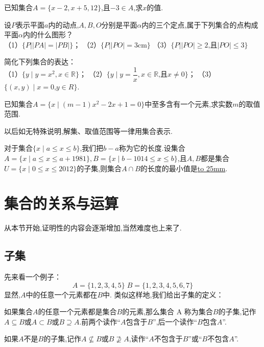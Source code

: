 \documentclass[lang=cn,math=cm,chinesefont=nofont,11pt,scheme=chinese,twocol]{elegantbook}
\begin{document}
\begin{exercise}\label{exer:6}
  已知集合$A=\{x-2,x+5,12\}$,且$-3\in A$,求$x$的值.
\end{exercise}

\begin{exercise}\label{exer:7}
  设$P$表示平面$a$内的动点,$A,B,O$分别是平面$\alpha$内的三个定点,属于下列集合的点构成平面$\alpha$内的什么图形？\\
  （1）$\{P||PA|=|PB|\}$；
  （2）$\{P||PO|=3\text{cm}\}$
  （3）$\{P||PO|\geqslant2\text{,且}|PO|\leqslant3\}$
\end{exercise}

\begin{exercise}\label{exer:8}
  简化下列集合的表达：\\
  （1）$\{y\mid y=x^2,x\in\mathbb{R}\}$；
  （2）$\{y\mid y=\dfrac{1}{x},x\in\mathbb{R}\text{,且}x\neq0\}$；
  （3）$\{(x,y)\mid x=0\text{,}y\in R\}$.
\end{exercise}

\begin{exercise}\label{exer:9}
  已知集合$A=\{x\mid(m-1)x^2-2x+1=0\}$中至多含有一个元素,求实数$m$的取值范围.
\end{exercise}
\begin{remark}
  以后如无特殊说明,解集、取值范围等一律用集合表示.
\end{remark}

\begin{exercise}\label{exer:202406261951}
  对于集合$\{x\mid a\leq x\leq b\}$,我们把$b-a$称为它的长度.设集合$A=\{x\mid a\leq x\leq a+1981\},B=\{x\mid b-1014\leq x\leq b\}$,且$A,B$都是集合$U=\{x\mid 0\leq x\leq 2012\}$的子集,则集合$A\cap B$的长度的最小值是\underline{\hbox to 25mm{}}.
\end{exercise}

\section{集合的关系与运算}

从本节开始,证明性的内容会逐渐增加,当然难度也上来了.

\subsection{子集}

先来看一个例子：$$A=\{1,2,3,4,5\}\;B=\{1,2,3,4,5,6,7\}$$
显然,$A$中的任意一个元素都在$B$中.
类似这样地,我们给出子集的定义：

\begin{definition}[子集]
  如果集合$A$的任意一个元素都是集合$B$的元素,那么集合 A 称为集合$B$的子集,记作$A\subseteq B$或$A\subset B$或$B\supseteq A$.前两个读作“$A$包含于$B$”,后一个读作“$B$包含$A$”.

  如果$A$不是$B$的子集,记作$A\nsubseteq B$或$B\nsupseteq A$,读作“$A$不包含于$B$”或“$B$不包含$A$”.
\end{definition}
\end{document}

